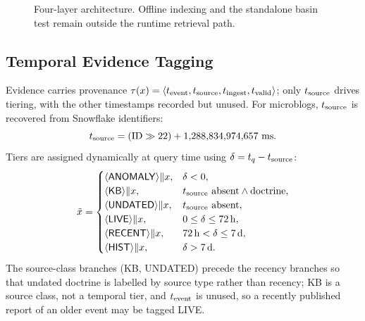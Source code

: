 \documentclass[conference]{IEEEtran}
\begin{document}
\begin{figure}[t]
{%
}%
\caption{Four-layer architecture. Offline indexing and the standalone basin test remain outside the runtime retrieval path.}
\label{fig:arch}
\end{figure}

\subsection{Temporal Evidence Tagging}
Evidence carries provenance $\tau(x)=\langle t_{\rm event},t_{\rm source},t_{\rm ingest},t_{\rm valid}\rangle$; only $t_{\rm source}$ drives tiering, with the other timestamps recorded but unused. For microblogs, $t_{\rm source}$ is recovered from Snowflake identifiers:
\begin{equation}
t_{\rm source}=(\mathrm{ID}\gg22)+1{,}288{,}834{,}974{,}657~\mathrm{ms}.
\label{eq:snow}
\end{equation}
Tiers are assigned dynamically at query time using $\delta=t_q-t_{\rm source}$:
\begin{equation}
\tilde{x}=
\begin{cases}
\langle\mathsf{ANOMALY}\rangle\Vert x,&\delta<0,\\
\langle\mathsf{KB}\rangle\Vert x,&t_{\rm source}\ \text{absent}\land\text{doctrine},\\
\langle\mathsf{UNDATED}\rangle\Vert x,&t_{\rm source}\ \text{absent},\\
\langle\mathsf{LIVE}\rangle\Vert x,&0\le\delta\le72\,\mathrm{h},\\
\langle\mathsf{RECENT}\rangle\Vert x,&72\,\mathrm{h}<\delta\le7\,\mathrm{d},\\
\langle\mathsf{HIST}\rangle\Vert x,&\delta>7\,\mathrm{d}.
\end{cases}
\label{eq:tgi}
\end{equation}
The source-class branches (\textsc{KB}, \textsc{UNDATED}) precede the recency branches so that undated doctrine is labelled by source type rather than recency; \textsc{KB} is a source class, not a temporal tier, and $t_{\rm event}$ is unused, so a recently published report of an older event may be tagged \textsc{LIVE}.
\end{document}
